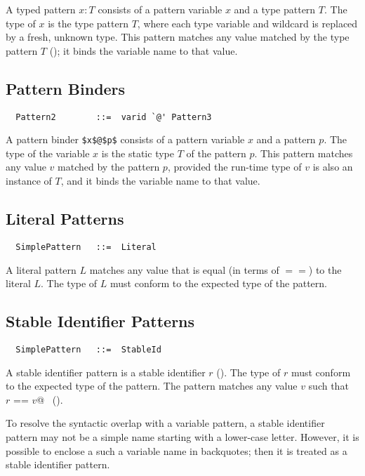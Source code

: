 A typed pattern $x: T$ consists of a pattern variable $x$ and a
type pattern $T$.  The type of $x$ is the type pattern $T$, where 
each type variable and wildcard is replaced by a fresh, unknown type.
This pattern matches any value matched by the type
pattern $T$ (); it binds the variable name to
that value.  

\subsection{Pattern Binders}
\label{sec:pattern-binders}
\syntax
\begin{lstlisting}
  Pattern2        ::=  varid `@' Pattern3
\end{lstlisting}
A pattern binder \lstinline|$x$@$p$| consists of a pattern variable $x$ and a 
pattern $p$. The type of the variable $x$ is the static type $T$ of the pattern $p$.
This pattern matches any value $v$ matched by the pattern $p$, 
provided the run-time type of $v$ is also an instance of $T$, 
and it binds the variable name to that value.

\subsection{Literal Patterns}

\syntax\begin{lstlisting}
  SimplePattern   ::=  Literal
\end{lstlisting}

A literal pattern $L$ matches any value that is equal (in terms of
$==$) to the literal $L$. The type of $L$ must conform to the
expected type of the pattern.

\subsection{Stable Identifier Patterns} 

\syntax
\begin{lstlisting}
  SimplePattern   ::=  StableId
\end{lstlisting}

A stable identifier pattern is a stable identifier $r$
(). The type of $r$ must conform to the expected
type of the pattern. The pattern matches any value $v$ such that
~\lstinline@$r$ == $v$@~ ().

To resolve the syntactic overlap with a variable pattern, a
stable identifier pattern may not be a simple name starting with a lower-case
letter. However, it is possible to enclose a such a variable name in
backquotes; then it is treated as a stable identifier pattern.

